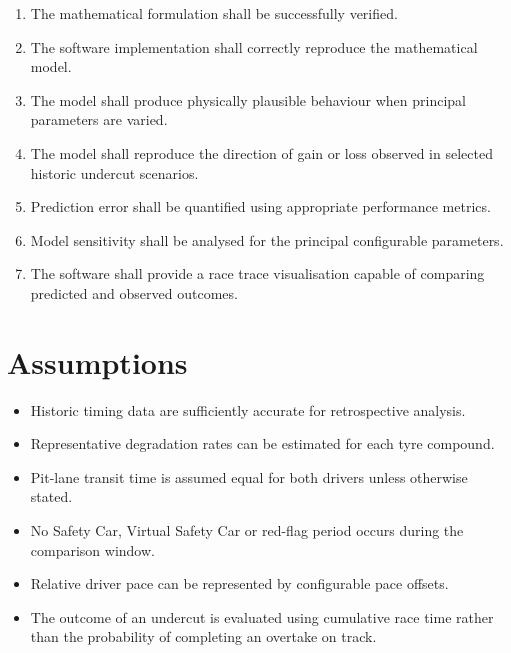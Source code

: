 \begin{enumerate}
    \item The mathematical formulation shall be successfully verified.
    \item The software implementation shall correctly reproduce the mathematical model.
    \item The model shall produce physically plausible behaviour when principal parameters are varied.
    \item The model shall reproduce the direction of gain or loss observed in selected historic undercut scenarios.
    \item Prediction error shall be quantified using appropriate performance metrics.
    \item Model sensitivity shall be analysed for the principal configurable parameters.
    \item The software shall provide a race trace visualisation capable of comparing predicted and observed outcomes.
\end{enumerate}

\section{Assumptions}
\label{sec:project-assumptions}


\begin{itemize}
    \item Historic timing data are sufficiently accurate for retrospective analysis.
    \item Representative degradation rates can be estimated for each tyre compound.
    \item Pit-lane transit time is assumed equal for both drivers unless otherwise stated.
    \item No Safety Car, Virtual Safety Car or red-flag period occurs during the comparison window.
    \item Relative driver pace can be represented by configurable pace offsets.
    \item The outcome of an undercut is evaluated using cumulative race time rather than the probability of completing an overtake on track.
\end{itemize}

